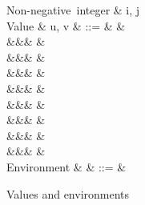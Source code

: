 \begin{figure}[H]
\begin{syntaxfig}
\mbox{Non-negative integer}
&
i, j
\\[2mm]
\mbox{Value}
&
u, v
&
::=
&
\hole
&
\\
&&&
\annTrue{\alpha} \mid \annFalse{\alpha}
&
\\
&&&
&
\\
&&&
&
\\
&&&
\annNil{\alpha}
&
\\
&&&
&
\\
&&&
&
\\
&&&
\exPrim{\phi}
&
\\
&&&
&
\\[2mm]
\mbox{Environment}
&
\rho
&
::=
&
\end{syntaxfig}
\caption{Values and environments}
\end{figure}
